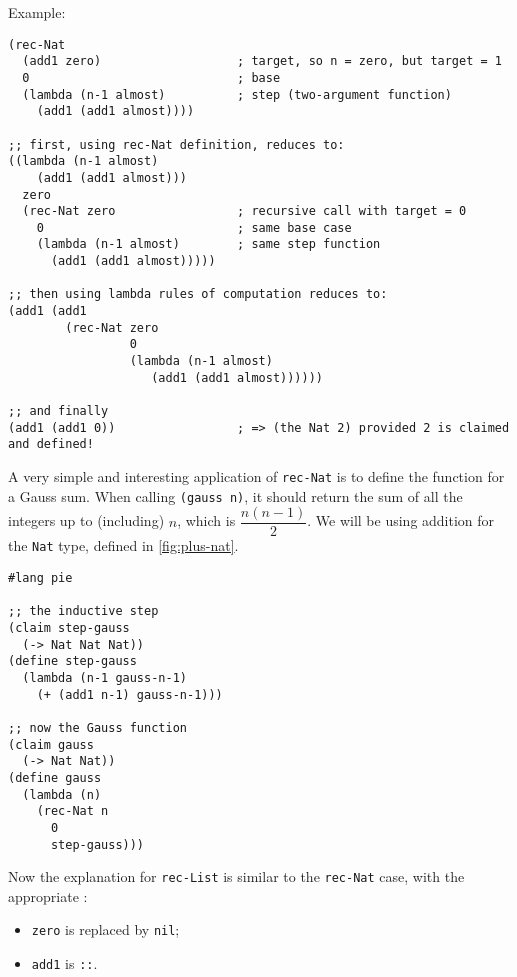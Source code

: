 Example:
{
  \small
\begin{verbatim}
(rec-Nat 
  (add1 zero)                   ; target, so n = zero, but target = 1
  0                             ; base
  (lambda (n-1 almost)          ; step (two-argument function)
    (add1 (add1 almost))))

;; first, using rec-Nat definition, reduces to:
((lambda (n-1 almost)
    (add1 (add1 almost)))
  zero
  (rec-Nat zero                 ; recursive call with target = 0
    0                           ; same base case
    (lambda (n-1 almost)        ; same step function
      (add1 (add1 almost)))))

;; then using lambda rules of computation reduces to:
(add1 (add1
        (rec-Nat zero
                 0
                 (lambda (n-1 almost)
                    (add1 (add1 almost))))))

;; and finally
(add1 (add1 0))                 ; => (the Nat 2) provided 2 is claimed and defined!
\end{verbatim}
}

A very simple and interesting application of \texttt{rec-Nat} is to define
the function for a Gauss sum. When calling \texttt{(gauss n)}, it should
return the sum of all the integers up to (including) $ n $, which is
$ \dfrac{n(n-1)}{2} $. We will be using addition for the \texttt{Nat}
type, defined in \ref{fig:plus-nat}.
{
  \small
\begin{verbatim}
#lang pie

;; the inductive step
(claim step-gauss
  (-> Nat Nat Nat))
(define step-gauss
  (lambda (n-1 gauss-n-1)
    (+ (add1 n-1) gauss-n-1)))

;; now the Gauss function
(claim gauss
  (-> Nat Nat))
(define gauss
  (lambda (n)
    (rec-Nat n
      0
      step-gauss)))
\end{verbatim}
}

\vspace{0.3cm}

Now the explanation for \texttt{rec-List} is similar to the \texttt{rec-Nat} case,
with the appropriate :
\begin{itemize}
\item \texttt{zero} is replaced by \texttt{nil};
\item \texttt{add1} is \texttt{::}.
\end{itemize}

